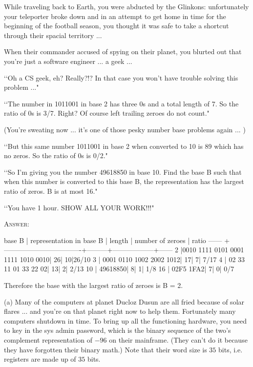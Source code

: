 \newpage
\nextq
While traveling back to Earth, you were abducted by the Glinkons:
unfortunately your teleporter broke down and in an attempt to get home
in time for the beginning of the football season,
you thought it was safe to take a shortcut through their spacial territory ...

When their commander accused of spying on their planet,
you blurted out that you're just a software engineer ... a geek ...

\lq\lq Oh a CS geek, eh? Really?!?
In that case you won't have trouble solving this problem ..."

\lq\lq The number in 1011001 in base 2 has three 0s  and a total length of 7.
So the ratio of 0s is 3/7.
Right? Of course left trailing zeroes do not count."

(You're sweating now ...
it's one of those pesky number base problems again ... )

\lq\lq But this same number 1011001 in base 2 when converted to 10 is 89 which
has no zeros. So the ratio of 0s is 0/2."
 
\lq\lq So I'm giving you the number 49618850 in base 10.
Find the base B such that when this number is converted to this base B, the
representation has the largest ratio of zeros. B is at most 16."

\lq\lq You have 1 hour. SHOW ALL YOUR WORK!!!"

\textsc{Answer:}
\begin{answercode}
base B    |     representation in base B     | length  | number of zeroes | ratio
------    +----------------------------------+---------+------------------+------
     2    |0010 1111 0101 0001 1111 1010 0010|       26|                10|26/10
     3    |          0001 0110 1002 2002 1012|       17|                 7| 7/17
     4    |              02 33 11 01 33 22 02|       13|                 2| 2/13
    10    |                          49618850|        8|                 1| 1/8
    16    |                         02F5 1FA2|        7|                 0| 0/7

Therefore the base with the largest ratio of zeroes is B = 2.

\end{answercode}

\newpage
\nextq
(a) Many of the computers at planet Ducloz Dusun are all fried because
of solar flares ... and you're on that planet right now to help them.
Fortunately many computers shutdown in time.
To bring up all the functioning hardware, you need to key in the sys admin
password, which is the binary sequence of the two's complement representation
of $-96$ on their mainframe.
(They can't do it because they have forgotten their binary math.)
Note that their word size is $35$ bits, i.e. registers are made up of $35$ bits.

